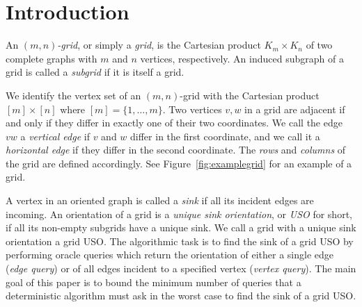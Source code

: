\documentclass[runningheads,a4paper]{llncs}
\begin{document}
\section{Introduction} \label{sec:intro}
An \emph{$(m,n)$-grid}, or simply a \emph{grid}, is the Cartesian product $K_m \times K_n$ of two complete graphs with $m$ and $n$ vertices, respectively. 
An induced subgraph of a grid is called a \emph{subgrid} if it is itself a grid.

We identify the vertex set of an $(m,n)$-grid with the Cartesian product $[m] \times [n]$ where $[m] = \{1,\ldots,m\}$. Two
vertices $v,w$ in a grid are adjacent if and only if they differ in
exactly one of their two coordinates.
We call the edge $vw$ a \emph{vertical edge} if $v$ and $w$ differ in the
first coordinate, and we call it a \emph{horizontal edge} if they differ in the
second coordinate. The \emph{rows} and \emph{columns} of the grid are defined accordingly.
See Figure~\ref{fig:examplegrid} for an example of a grid.

A vertex in an oriented graph is called a \emph{sink} if all its incident edges are incoming.
An orientation of a grid is a \emph{unique sink orientation}, or \emph{USO}
for short, if all its non-empty subgrids have a unique sink. We call a grid with a unique sink orientation a grid USO.
The algorithmic task is to find the sink of a grid USO by performing oracle queries which return the orientation of either a single edge (\emph{edge query}) or of all edges incident to a specified vertex (\emph{vertex query}). 
The main goal of this paper is to bound the minimum number of queries that a deterministic algorithm must ask in the worst case to find the sink of a grid USO. 
\end{document}
